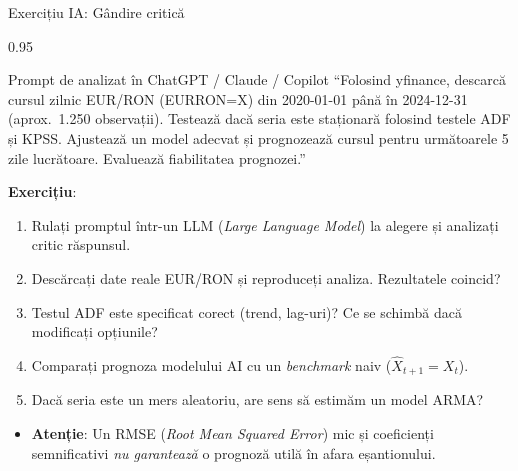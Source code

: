\documentclass[9pt, aspectratio=169, t]{beamer}
\begin{document}
\begin{frame}{Exercițiu IA: Gândire critică}
    \begin{cminipage}{0.95\textwidth}
        \vspace{-2mm}
        \begin{block}{\footnotesize Prompt de analizat în ChatGPT / Claude / Copilot}
            {\small
            ``Folosind yfinance, descarcă cursul zilnic EUR/RON (EURRON=X) din 2020-01-01 până în 2024-12-31 (aprox.\ 1.250 observații). Testează dacă seria este staționară folosind testele ADF și KPSS. Ajustează un model adecvat și prognozează cursul pentru următoarele 5 zile lucrătoare. Evaluează fiabilitatea prognozei.''
            }
        \end{block}
        \vspace{-1mm}
        {\small
        \textbf{Exercițiu}:
        \begin{enumerate}\setlength{\itemsep}{2pt}
            \item Rulați promptul într-un LLM (\textit{Large Language Model}) la alegere și analizați critic răspunsul.
            \item Descărcați date reale EUR/RON și reproduceți analiza. Rezultatele coincid?
            \item Testul ADF este specificat corect (trend, lag-uri)? Ce se schimbă dacă modificați opțiunile?
            \item Comparați prognoza modelului AI cu un \textit{benchmark} naiv ($\hat{X}_{t+1} = X_t$).
            \item Dacă seria este un mers aleatoriu, are sens să estimăm un model ARMA?
        \end{enumerate}
        }
        \vspace{-1mm}
        \begin{alertblock}{}
            \begin{itemize}\setlength{\itemsep}{0pt}
                \item {\small \textbf{Atenție}: Un RMSE (\textit{Root Mean Squared Error}) mic și coeficienți semnificativi \textit{nu garantează} o prognoză utilă în afara eșantionului.}
            \end{itemize}
        \end{alertblock}
    \end{cminipage}
\end{frame}

\end{document}
